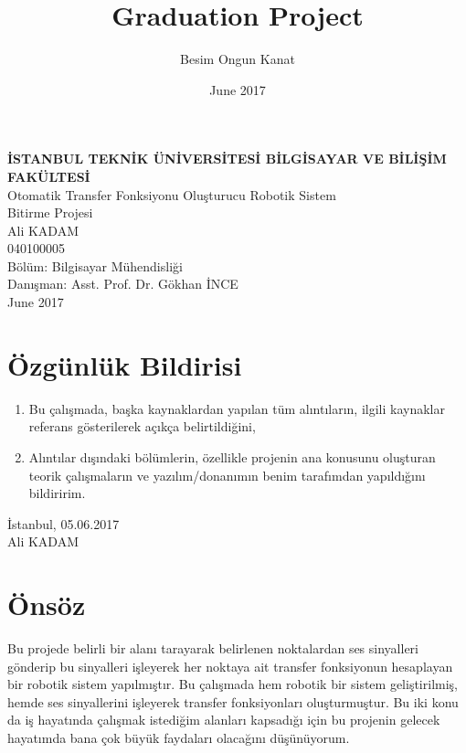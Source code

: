 \documentclass[a4paper, 12pt, titlepage]{article}
\title{Graduation Project}
\author{Besim Ongun Kanat}
\date{June 2017}
\begin{document}

\begin{titlepage}
    \bfseries %
    \sffamily %
	\begin{center}
		\LARGE{\textbf{İSTANBUL TEKNİK ÜNİVERSİTESİ BİLGİSAYAR VE BİLİŞİM FAKÜLTESİ} } \\
		\vspace{5.5cm}
		\LARGE{Otomatik Transfer Fonksiyonu Oluşturucu Robotik Sistem}  \\
		\vspace{4.5cm}
		\Large{Bitirme Projesi} \\
        \vspace{0.5cm}
		\Large{Ali KADAM} \\
     	\Large{040100005} \\
        \vspace{4cm}
        \large{Bölüm: Bilgisayar Mühendisliği} \\
        \vspace{1.5cm}
        \large{Danışman: Asst. Prof. Dr. Gökhan İNCE} \\
		\vspace{\fill} %
		\large{\normalfont \sffamily June 2017}
	\end{center}
\end{titlepage}

\newpage
\section*{Özgünlük Bildirisi}
\begin{enumerate}
    \item Bu çalışmada, başka kaynaklardan yapılan tüm alıntıların, ilgili kaynaklar \\ referans gösterilerek açıkça belirtildiğini,
    \item Alıntılar dışındaki bölümlerin, özellikle projenin ana konusunu oluşturan teorik çalışmaların ve yazılım/donanımın benim tarafımdan yapıldığını
    bildiririm.
\end{enumerate}
\vspace{1em}
İstanbul, 05.06.2017
\vspace{3em}\\Ali KADAM

\newpage
\section*{Önsöz}
Bu projede belirli bir alanı tarayarak belirlenen noktalardan ses sinyalleri gönderip bu sinyalleri işleyerek her noktaya ait transfer fonksiyonun hesaplayan bir robotik sistem yapılmıştır. Bu çalışmada hem robotik bir sistem geliştirilmiş, hemde ses sinyallerini işleyerek transfer fonksiyonları oluşturmuştur. Bu iki konu da iş hayatında çalışmak istediğim alanları kapsadığı için bu projenin gelecek hayatımda bana çok büyük faydaları olacağını düşünüyorum.
\end{document}
